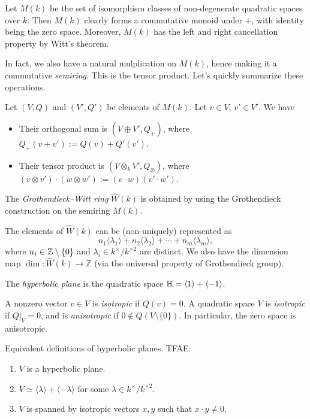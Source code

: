 \documentclass{article}
\newcommand{\GW}{\widehat{W}}
\begin{document}
Let $M(k)$ be the set of isomorphism classes of non-degenerate quadratic spaces over $k$. Then $M(k)$ clearly forms a commutative monoid under $+$, with identity being the zero space. Moreover, $M(k)$ has the left and right cancellation property by Witt's theorem.

In fact, we also have a natural mulplication on $M(k)$, hence making it a commutative \emph{semiring}. This is the tensor product. Let's quickly summarize these operations.

\begin{definition}
    Let $(V,Q)$ and $(V',Q')$ be elements of $M(k)$. Let $v\in V$, $v'\in V'$. We have
    \begin{itemize}
        \item Their orthogonal sum is $(V\oplus V',Q_{+})$, where $Q_{+}(v+v'):=Q(v)+Q'(v')$.
        \item Their tensor product is $(V\otimes_k V',Q_{\otimes})$, where $(v\otimes v')\cdot(w\otimes w'):=(v\cdot w)(v'\cdot w')$.
    \end{itemize}
\end{definition}

\begin{definition}
    The \emph{Grothendieck--Witt ring} $\GW(k)$ is obtained by using the Grothendieck construction on the semiring $M(k)$.
\end{definition}

The elements of $\GW(k)$ can be (non-uniquely) represented as
\[ n_1\langle\lambda_1\rangle+n_2\langle\lambda_2\rangle+\cdots+n_m\langle\lambda_m\rangle, \]
where $n_i\in\mathbb{Z}\setminus\{0\}$ and $\lambda_i\in k^\times/k^{\times 2}$ are distinct. We also have the dimension map $\dim: \GW(k)\longrightarrow\mathbb{Z}$ (via the universal property of Grothendieck group).

\begin{definition}
    The \emph{hyperbolic plane} is the quadratic space $\mathbb{H}=\langle 1\rangle+\langle -1\rangle$.
\end{definition}

\begin{definition}
    A nonzero vector $v\in V$ is \emph{isotropic} if $Q(v)=0$. A quadratic space $V$ is \emph{isotropic} if $\left.Q\right\vert_V=0$, and is \emph{anisotropic} if $0\notin Q(V\setminus\{0\})$. 
    In particular, the zero space is anisotropic.
\end{definition}

\begin{lemma}\label{lem.hypplane}
    Equivalent definitions of hyperbolic planes. TFAE:
    \begin{enumerate}
        \item $V$ is a hyperbolic plane.
        \item $V\simeq \langle\lambda\rangle + \langle-\lambda\rangle$ for some $\lambda\in k^\times/k^{\times 2}$.
        \item $V$ is spanned by isotropic vectors $x,y$ such that $x\cdot y\neq 0$.
    \end{enumerate}
\end{lemma}
\end{document}
